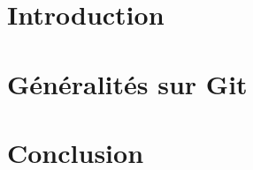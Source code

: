 \documentclass{report}
\begin{document}
	    
		\chapter*{Introduction}
	     
     \chapter*{Généralités sur Git}
	     
	     \chapter*{Conclusion}
	     
\end{document}
